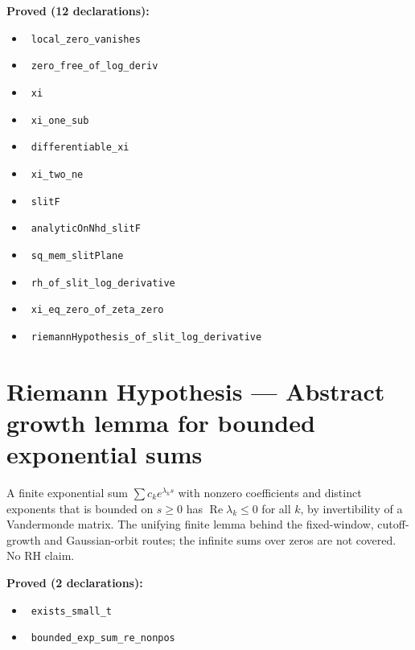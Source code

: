\documentclass{report}
\theoremstyle{definition}
\begin{document}
\noindent\textbf{Proved (12 declarations):}
\begin{itemize}
  \item {}\leanok\ \texttt{local\_zero\_vanishes}
  \item {}\leanok\ \texttt{zero\_free\_of\_log\_deriv}
  \item {}\leanok\ \texttt{xi}
  \item {}\leanok\ \texttt{xi\_one\_sub}
  \item {}\leanok\ \texttt{differentiable\_xi}
  \item {}\leanok\ \texttt{xi\_two\_ne}
  \item {}\leanok\ \texttt{slitF}
  \item {}\leanok\ \texttt{analyticOnNhd\_slitF}
  \item {}\leanok\ \texttt{sq\_mem\_slitPlane}
  \item {}\leanok\ \texttt{rh\_of\_slit\_log\_derivative}
  \item {}\leanok\ \texttt{xi\_eq\_zero\_of\_zeta\_zero}
  \item {}\leanok\ \texttt{riemannHypothesis\_of\_slit\_log\_derivative}
\end{itemize}

\section{Riemann Hypothesis --- Abstract growth lemma for bounded exponential sums}
A finite exponential sum $\sum c_ke^{\lambda_ks}$ with nonzero coefficients and distinct exponents that is bounded on $s\ge0$ has $\operatorname{Re}\lambda_k\le0$ for all $k$, by invertibility of a Vandermonde matrix. The unifying finite lemma behind the fixed-window, cutoff-growth and Gaussian-orbit routes; the infinite sums over zeros are not covered. No RH claim.

\noindent\textbf{Proved (2 declarations):}
\begin{itemize}
  \item {}\leanok\ \texttt{exists\_small\_t}
  \item {}\leanok\ \texttt{bounded\_exp\_sum\_re\_nonpos}
\end{itemize}
\end{document}

